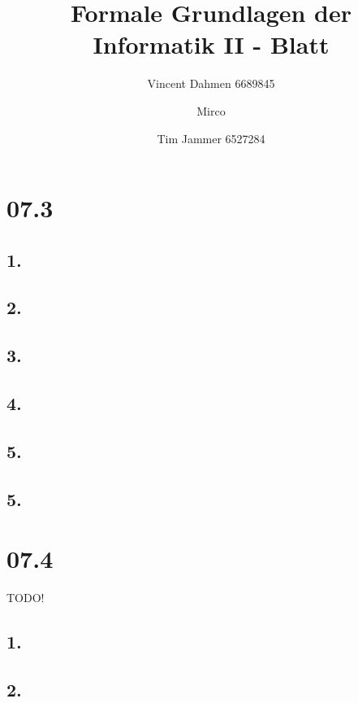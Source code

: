 \documentclass[12pt,a4paper]{article}
\title{Formale Grundlagen der Informatik II - Blatt \blattNr}
\author{Vincent Dahmen 6689845  \and Mirco \and Tim Jammer 6527284}
\def \blattNr{07}
\begin{document}
\maketitle{}

\section*{\blattNr .3}
\subsection*{1.}


\subsection*{2.}


\subsection*{3.}


\subsection*{4.}


\subsection*{5.}


\subsection*{5.}


\pagebreak

\section*{\blattNr .4}

TODO!
\subsection*{1.}
%

%
%
\subsection*{2.}
%
%
\end{document}
